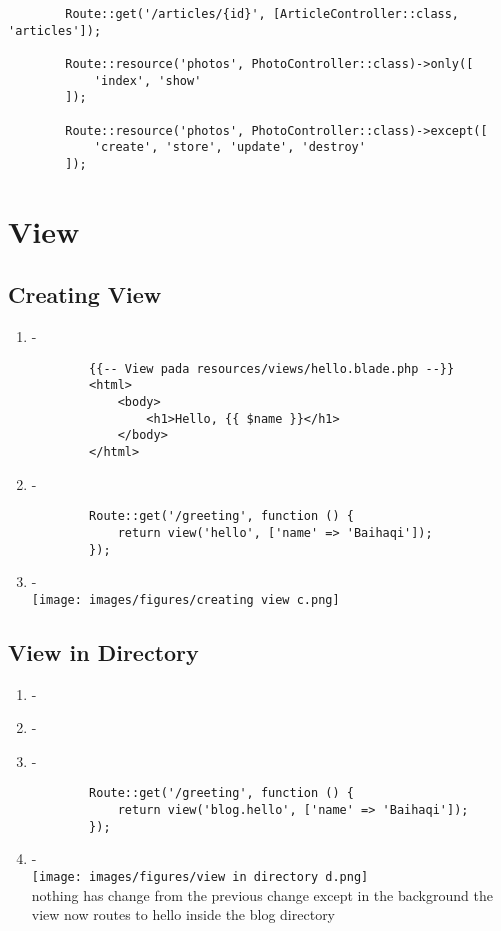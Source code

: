 \documentclass[12pt,titlepage]{article}
\begin{document}
\begin{enumerate}[label=\alph*.]
\begin{verbatim}
        Route::get('/articles/{id}', [ArticleController::class, 'articles']);
        
        Route::resource('photos', PhotoController::class)->only([
            'index', 'show'
        ]);
        
        Route::resource('photos', PhotoController::class)->except([
            'create', 'store', 'update', 'destroy'
        ]);
    \end{verbatim}
\end{enumerate}

\newpage

\section{View}
\subsection{Creating View}
\begin{enumerate}[label=\alph*.]
    \item -
    \begin{verbatim}
        {{-- View pada resources/views/hello.blade.php --}}
        <html>
            <body>
                <h1>Hello, {{ $name }}</h1>
            </body>
        </html>
    \end{verbatim}
    \item -
    \begin{verbatim}
        Route::get('/greeting', function () {
            return view('hello', ['name' => 'Baihaqi']);
        });
    \end{verbatim}
    \item - \\ \texttt{[image: images/figures/creating view c.png]}
\end{enumerate}
\newpage
\subsection{View in Directory}
\begin{enumerate}[label=\alph*.]
    \item -
    \item -
    \item -
    \begin{verbatim}
        Route::get('/greeting', function () {
            return view('blog.hello', ['name' => 'Baihaqi']);
        });
    \end{verbatim}
    \item - \\ \texttt{[image: images/figures/view in directory d.png]} \\ nothing has change from the previous change except in the background the view now routes to hello inside the blog directory
\end{enumerate}
\newpage
\end{document}

